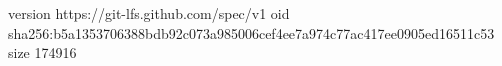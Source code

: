 version https://git-lfs.github.com/spec/v1
oid sha256:b5a1353706388bdb92c073a985006cef4ee7a974c77ac417ee0905ed16511c53
size 174916
